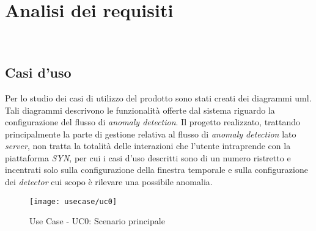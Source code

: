 
\chapter{Analisi dei requisiti}
\label{cap:analisi-requisiti}

\\


\section{Casi d'uso}
Per lo studio dei casi di utilizzo del prodotto sono stati creati dei diagrammi \gls{uml}. Tali diagrammi descrivono le funzionalità offerte dal sistema riguardo la configurazione del flusso di \textit{anomaly detection}. Il progetto realizzato, trattando principalmente la parte di gestione relativa al flusso di \textit{anomaly detection} lato \textit{server}, non tratta la totalità delle interazioni che l'utente intraprende con la piattaforma \textit{SYN}, per cui i casi d'uso descritti sono di un numero ristretto e incentrati solo sulla configurazione della finestra temporale e sulla configurazione dei \textit{detector} cui scopo è rilevare una possibile anomalia.

\begin{figure}[H] 
    \centering 
    \texttt{[image: usecase/uc0]} 
    \caption{Use Case - UC0: Scenario principale}
\end{figure}


